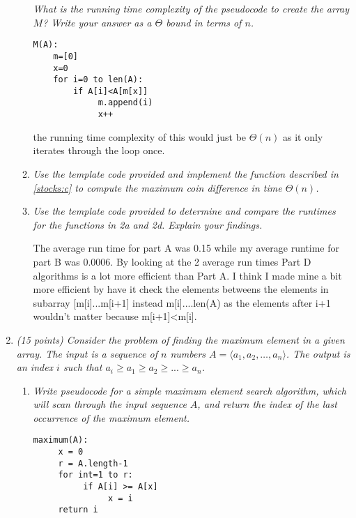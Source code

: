\documentclass[12pt]{article}
\begin{document}
\begin{enumerate}
\begin{enumerate}
	\textit{What is the running time complexity of the pseudocode to create the array $M$? Write your answer as a $\Theta$ bound in terms of $n$.}

	\begin{verbatim}
M(A):
    m=[0]
    x=0
    for i=0 to len(A):
        if A[i]<A[m[x]]
             m.append(i)
             x++  

	\end{verbatim}

the running time complexity of this would just be $\Theta(n)$ as it only iterates through the loop once.


	\item\textit{ \label{stocks:d} Use the template code provided and implement the function described in \eqref{stocks:c} to compute the maximum coin difference in time $\Theta(n)$.}

	\item\textit{ \label{stocks:e} Use the template code provided to determine and compare the runtimes for the functions in 2a and 2d. Explain your findings.}

The average run time for part A was 0.15 while my average runtime for part B was 0.0006. By looking at the 2 average run times Part D algorithms is a lot more efficient than Part A. I think I made mine a bit more efficient by have it check the elements betweens the elements in subarray [m[i]...m[i+1] instead m[i]....len(A) as the elements after i+1 wouldn't matter because m[i+1]<m[i].


	\end{enumerate}

	\pagebreak

 	\item \textit{(15 points) Consider the problem of finding the maximum element in a given array. The input is a sequence of $n$ numbers $A=\langle a_{1},a_{2},\dots,a_{n}\rangle$. The output is an index $i$ such that $a_{i} \geq a_{1} \geq a_{2} \geq ... \geq a_{n}$.}

 	\begin{enumerate}
 	\item \textit{Write pseudocode for a simple maximum element search algorithm, which will scan through the input sequence $A$, and return the index of the last occurrence of the maximum element.}

\begin{verbatim}
maximum(A):
     x = 0
     r = A.length-1
     for int=1 to r:
          if A[i] >= A[x]
               x = i
     return i 


\end{verbatim}
\end{enumerate}
\end{enumerate}
\end{document}
